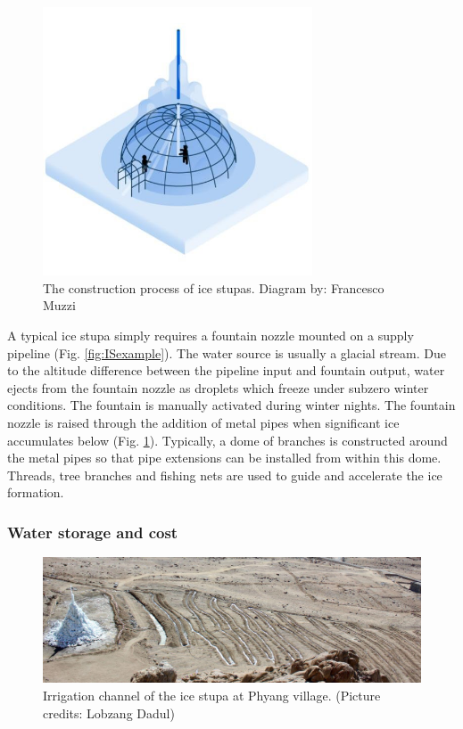 \begin{figure}[htb]
	\centering
	\includegraphics[width=8cm]{figs/IS_science.jpg}
	\caption{The construction process of ice stupas. Diagram by: Francesco Muzzi }
	\label{fig:ISconstruction}
\end{figure}

A typical ice stupa simply requires a fountain nozzle mounted on a supply pipeline (Fig. \ref{fig:ISexample}).
The water source is usually a glacial stream. Due to the altitude difference between the pipeline input and
fountain output, water ejects from the fountain nozzle as droplets which freeze under subzero winter conditions.
The fountain is manually activated during winter nights. The fountain nozzle is raised through the addition of
metal pipes when significant ice accumulates below (Fig. \ref{fig:ISconstruction}). Typically, a dome of
branches is constructed around the metal pipes so that pipe extensions can be installed from within this dome.
Threads, tree branches and fishing nets are used to guide and accelerate the ice formation.

\subsubsection{Water storage and cost}

\begin{figure}[htb]
	\centering
	\includegraphics[width=\textwidth]{figs/IS_irrigation.jpeg}
	\caption{Irrigation channel of the ice stupa at Phyang village. (Picture credits: Lobzang Dadul) }
	\label{fig:ISirrigation}
\end{figure}

